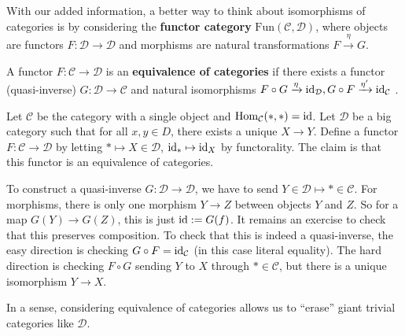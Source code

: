 With our added information, a better way to think about isomorphisms of categories is by considering the \textbf{functor category} $\mathrm{Fun}(\mathcal{C} ,\mathcal{D} )$, where objects are functors $F \colon \mathcal{D}  \to \mathcal{D} $ and morphisms are natural transformations $F \xrightarrow{\eta} G$.

\begin{definition}[]
    A functor $F \colon \mathcal{C}  \to \mathcal{D} $ is an \textbf{equivalence of categories} if there exists a functor (quasi-inverse) $G \colon \mathcal{D}  \to \mathcal{C} $ and natural isomorphisms $F \circ G\xrightarrow{\eta} \operatorname{id}_{\mathcal{D} },G \circ F \xrightarrow{\eta'} \operatorname{id}_{\mathcal{C} } $ .
\end{definition}
\begin{example}
    Let $\mathcal{C} $ be the category with a single object and $\operatorname{Hom} _{\mathcal{C} }(*,*)=\operatorname{id}$. Let $\mathcal{D} $ be a big category such that for all $x,y \in D$, there exists a unique $X \to Y$. Define a functor $F \colon \mathcal{C}  \to \mathcal{D} $ by letting $* \mapsto  X \in \mathcal{D} $, $\operatorname{id}_* \mapsto \operatorname{id}_X$ by functorality. The claim is that this functor is an equivalence of categories.

    To construct a quasi-inverse $G \colon \mathcal{D}  \to \mathcal{D} $, we have to send $Y \in \mathcal{D} \mapsto * \in \mathcal{C} $. For morphisms, there is only one morphism $Y \to Z$ between objects $Y$ and $Z$. So for a map $G(Y) \to G(Z)$, this is just $\operatorname{id}:=G(f)$. It remains an exercise to check that this preserves composition. To check that this is indeed a quasi-inverse, the easy direction is checking $G \circ F=\operatorname{id} _{\mathcal{C} }$ (in this case literal equality). The hard direction is checking $F \circ G$ sending $Y$ to $X$ through $* \in \mathcal{C} $, but there is a unique isomorphism $Y \to X$.

    In a sense, considering equivalence of categories allows us to ``erase'' giant trivial categories like $\mathcal{D} $.
\end{example}

